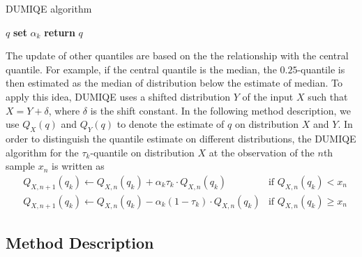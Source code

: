 \begin{algorithm}
    \caption{DUMIQE algorithm}\label{alg:DUMIQE}
    \begin{algorithmic}[1]
         $q$                 
                              
                \State \textbf{set} $\alpha_k$  
                \Else                           
                \EndIf
            \EndFor
        \State \textbf{return} $q$              
    \end{algorithmic}
\end{algorithm}

The update of other quantiles are based on the the relationship with the central quantile. For example, if the central quantile is the median, the $0.25$-quantile is then estimated as the median of distribution below the estimate of median. To apply this idea, DUMIQE uses a shifted distribution $Y$ of the input $X$ such that $X = Y + \delta$, where $\delta$ is the shift constant. In the following method description, we use $Q_X(q)$ and  $Q_Y(q)$ to denote the estimate of $q$ on distribution $X$ and $Y$. In order to distinguish the quantile estimate on different distributions, the DUMIQE algorithm for the $\tau_k$-quantile on distribution $X$ at the observation of the $n$th sample $x_n$ is written as
\begin{align}
        &Q_{X, n+1}(q_k) \leftarrow Q_{X, n}(q_k) + \alpha_k \tau_k \cdot Q_{X, n}(q_k)  & \text{if } Q_{X, n}(q_k) < x_n \\
        &Q_{X, n+1}(q_k) \leftarrow Q_{X, n}(q_k) - \alpha_k (1-\tau_k) \cdot Q_{X, n}(q_k)  & \text{if } Q_{X, n}(q_k) \geq x_n \nonumber
\end{align}

\subsection{Method Description}
\label{subsec: multi_shiftQ_description}

